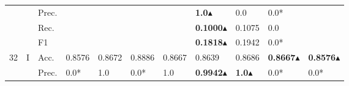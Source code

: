\begin{tabular}{cclllllllll}
    \multicolumn{1}{l}{}                                                                                       &                                   & Prec.                                                &                         &                         &                              &                         & \textbf{1.0}$\blacktriangle$                                                                & 0.0                                                                         & 0.0*                                      &                                           \\
    \multicolumn{1}{l}{}                                                                                       &                                   & Rec.                                                 &                         &                         &                              &                         & \textbf{0.1000}$\blacktriangle$                                                             & 0.1075                                                                      & 0.0                                       &                                           \\
    \multicolumn{1}{l}{}                                                                                       &                                   & F1                                                   &                         &                         &                              &                         & \textbf{0.1818}$\blacktriangle$                                                             & 0.1942                                                                      & 0.0*                                      &                                           \\ 
    \midrule
    \multirow{12}{*}{32}                                                                                       & \multirow{4}{*}{I}                & Acc.                                                 & 0.8576                  & 0.8672                  & 0.8886                       & 0.8667                  & 0.8639                                                                       & 0.8686                                                                      & \textbf{0.8667}$\blacktriangle$                          & \textbf{0.8576}$\blacktriangle$                          \\
                                                                                                               &                                   & Prec.                                                & 0.0*                    & 1.0                     & 0.0*                         & 1.0                     & \textbf{0.9942}$\blacktriangle$                                                             & \textbf{1.0}$\blacktriangle$                                                               & 0.0*                                      & 0.0*                                      \\

\end{tabular}
